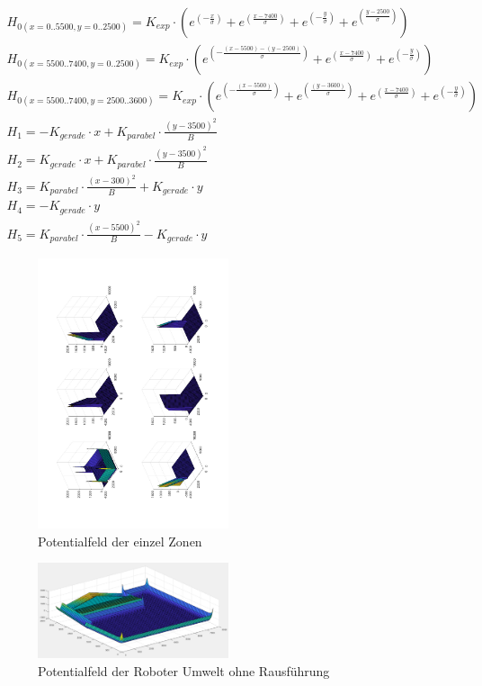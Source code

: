 \begin{align}
H_{0(x=0..5500,y=0..2500)} = K_{exp}\cdot(e^{(-\frac{x}{\sigma})}+e^{(\frac{x-7400}{\sigma})}+e^{(-\frac{y}{\sigma})}+e^{(\frac{y-2500}{\sigma})} ) \label{fun:H01}\\ 
H_{0(x=5500..7400,y=0..2500)} = K_{exp}\cdot(e^{(-\frac{(x-5500)-(y-2500)}{\sigma})}+e^{(\frac{x-7400}{\sigma})}+e^{(-\frac{y}{\sigma})} )\\ 
H_{0(x=5500..7400,y=2500..3600)} = K_{exp}\cdot(e^{(-\frac{(x-5500)}{\sigma})}+e^{(\frac{(y-3600)}{\sigma})}+e^{(\frac{x-7400}{\sigma})}+e^{(-\frac{y}{\sigma})} )\\ 
H_{1} = - K_{gerade}\cdot x + K_{parabel}\cdot\frac{(y-3500)^2}{B}\\
H_{2} = K_{gerade}\cdot x + K_{parabel}\cdot\frac{(y-3500)^2}{B}\\
H_{3} = K_{parabel}\cdot\frac{(x-300)^2}{B} + K_{gerade}\cdot y\\
H_{4} = - K_{gerade}\cdot y\\
H_{5} = K_{parabel}\cdot\frac{(x-5500)^2}{B}-K_{gerade}\cdot y
 \end{align}

\begin{figure}
	\centering	\includegraphics[width=0.5\textwidth,angle=-90]{grafiken/EinzelZonen.pdf}
	\caption{Potentialfeld der einzel Zonen}
	\label{fig:Poteinzeln}
\end{figure}

\begin{figure}
	\centering	\includegraphics[width=0.5\textwidth]{grafiken/Potentialfeld_ohne_2schraege.png}
	\caption{Potentialfeld der Roboter Umwelt ohne Rausführung}
	\label{fig:PotUmweltohne}
\end{figure}

